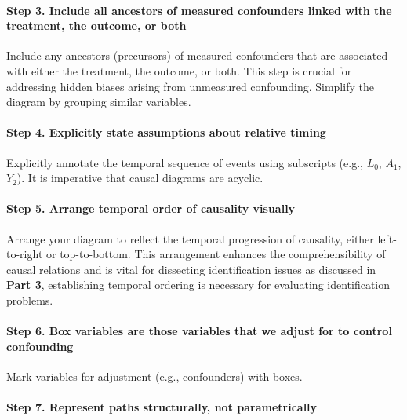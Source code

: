 \documentclass[
  singlecolumn]{article}
\let\oldparagraph\paragraph
\renewcommand{\paragraph}[1]{\oldparagraph{#1}\mbox{}}
\begin{document}
\paragraph{Step 3. Include all ancestors of measured confounders linked
with the treatment, the outcome, or
both}\label{step-3.-include-all-ancestors-of-measured-confounders-linked-with-the-treatment-the-outcome-or-both}

Include any ancestors (precursors) of measured confounders that are
associated with either the treatment, the outcome, or both. This step is
crucial for addressing hidden biases arising from unmeasured
confounding. Simplify the diagram by grouping similar variables.

\paragraph{Step 4. Explicitly state assumptions about relative
timing}\label{step-4.-explicitly-state-assumptions-about-relative-timing}

Explicitly annotate the temporal sequence of events using subscripts
(e.g., \(L_0\), \(A_1\), \(Y_2\)). It is imperative that causal diagrams
are acyclic.

\paragraph{Step 5. Arrange temporal order of causality
visually}\label{step-5.-arrange-temporal-order-of-causality-visually}

Arrange your diagram to reflect the temporal progression of causality,
either left-to-right or top-to-bottom. This arrangement enhances the
comprehensibility of causal relations and is vital for dissecting
identification issues as discussed in \hyperref[sec-part3]{\textbf{Part
3}}, establishing temporal ordering is necessary for evaluating
identification problems.

\paragraph{Step 6. Box variables are those variables that we adjust for
to control
confounding}\label{step-6.-box-variables-are-those-variables-that-we-adjust-for-to-control-confounding}

Mark variables for adjustment (e.g., confounders) with boxes.

\paragraph{Step 7. Represent paths structurally, not
parametrically}\label{step-7.-represent-paths-structurally-not-parametrically}
\end{document}
